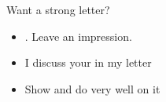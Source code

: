 \documentclass[aspectratio=169,11pt]{beamer}
\begin{document}
\begin{frame}{Want a strong letter?}
  \vfill
  \begin{itemize}\setlength{\itemsep}{1.2em}
    \item {}. Leave an impression.
    \item I discuss your  in my letter
    \item Show  and do very well on it
  \end{itemize}
  \vfill
  \vfill
\end{frame}

\begin{frame}[plain]
\end{frame}
\end{document}
